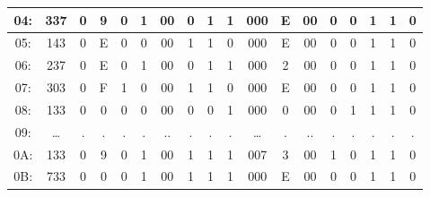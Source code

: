 \documentclass[oneside,a4paper,14pt]{extarticle}
\begin{document}
\begin{table}[H]
{\begin{tabular}{|c|c|c|c|c|c|c|c|c|c|c|c|c|c|c|c|c|c|}
			04: & 337   & 0                        & 9                             & 0                             & 1                   & 00 & 0                              & 1                            & 1                   & 000   & E    & 00 & 0 & 0                    & 1  & 1                    & 0                   \\ \hline
			05: & 143   & 0                        & E                             & 0                             & 0                   & 00 & 1                              & 1                            & 0                   & 000   & E    & 00 & 0 & 0                    & 1  & 1                    & 0                   \\ \hline
			06: & 237   & 0                        & E                             & 0                             & 1                   & 00 & 0                              & 1                            & 1                   & 000   & 2    & 00 & 0 & 0                    & 1  & 1                    & 0                   \\ \hline
			07: & 303   & 0                        & F                             & 1                             & 0                   & 00 & 1                              & 1                            & 0                   & 000   & E    & 00 & 0 & 0                    & 1  & 1                    & 0                   \\ \hline
			08: & 133   & 0                        & 0                             & 0                             & 0                   & 00 & 0                              & 0                            & 1                   & 000   & 0    & 00 & 0 & 1                    & 1  & 1                    & 0                   \\ \hline
			09: & \dots & .                        & .                             & .                             & .                   & .. & .                              & .                            & .                   & \dots & .    & .. & . & .                    & .  & .                    & .                   \\ \hline
			0A: & 133   & 0                        & 9                             & 0                             & 1                   & 00 & 1                              & 1                            & 1                   & 007   & 3    & 00 & 1 & 0                    & 1  & 1                    & 0                   \\ \hline
			0B: & 733   & 0                        & 0                             & 0                             & 1                   & 00 & 1                              & 1                            & 1                   & 000   & E    & 00 & 0 & 0                    & 1  & 1                    & 0                   \\ \hline

\end{tabular}}
\end{table}
\end{document}
